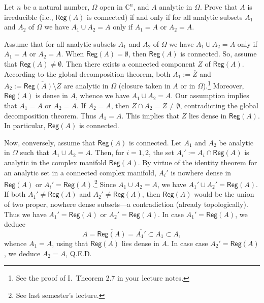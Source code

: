 \documentclass[a4paper]{amsart}
\newcommand{\C}{\mathbb{C}}
\newcommand{\Reg}[1]{\mathsf{Reg}(#1)}
\theoremstyle{remark}
\numberwithin{equation}{question}
\begin{document}
\begin{question}[subtitle=A criterion for irreducibility]
\label{qu:irred crit}
Let $n$ be a natural number, $\Omega$ open in $\C^n$, and $A$ analytic in $\Omega$. Prove that $A$ is irreducible (i.e., $\Reg A$ is connected) if and only if for all analytic subsets $A_1$ and $A_2$ of $\Omega$ we have $A_1 \cup A_2 = A$ only if $A_1 = A$ or $A_2 = A$.
\end{question}

\begin{solution}
Assume that for all analytic subsets $A_1$ and $A_2$ of $\Omega$ we have $A_1 \cup A_2 = A$ only if $A_1 = A$ or $A_2 = A$. When $\Reg A = \emptyset$, then $\Reg A$ is connected. So, assume that $\Reg A \ne \emptyset$. Then there exists a connected component $Z$ of $\Reg A$. According to the global decomposition theorem, both $A_1 := \overline Z$ and $A_2 := \overline{\Reg A \setminus Z}$ are analytic in $\Omega$ (closure taken in $A$ or in $\Omega$).\footnote{See the proof of I.~Theorem 2.7 in your lecture notes.} Moreover, $\Reg A$ is dense in $A$, whence we have $A_1 \cup A_2 = A$. Our assumption implies that $A_1 = A$ or $A_2 = A$. If $A_2 = A$, then $Z \cap A_2 = Z \ne \emptyset$, contradicting the global decomposition theorem. Thus $A_1 = A$. This implies that $Z$ lies dense in $\Reg A$. In particular, $\Reg A$ is connected.

Now, conversely, assume that $\Reg A$ is connected. Let $A_1$ and $A_2$ be analytic in $\Omega$ such that $A_1 \cup A_2 = A$. Then, for $i = 1,2$, the set $A_i' := A_i \cap \Reg A$ is analytic in the complex manifold $\Reg A$. By virtue of the identity theorem for an analytic set in a connected complex manifold, $A_i'$ is nowhere dense in $\Reg A$ or $A_i' = \Reg A$.\footnote{See last semester's lecture.} Since $A_1 \cup A_2 = A$, we have $A_1' \cup A_2' = \Reg A$. If both $A_1' \ne \Reg A$ and $A_2' \ne \Reg A$, then $\Reg A$ would be the union of two proper, nowhere dense subsets---a contradiction (already topologically). Thus we have $A_1' = \Reg A$ or $A_2' = \Reg A$. In case $A_1' = \Reg A$, we deduce
\[
A = \overline{\Reg A} = \overline{A_1'} \subset A_1 \subset A,
\]
whence $A_1 = A$, using that $\Reg A$ lies dense in $A$. In case case $A_2' = \Reg A$, we deduce $A_2 = A$, Q.E.D.


\end{solution}
\end{document}
